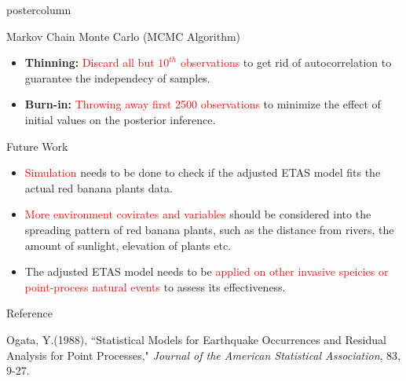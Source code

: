 \documentclass[final]{beamer}\usepackage[]{graphicx}\usepackage[]{color}
\newcommand{\red}{\textcolor{red}}
\begin{document}
{\begin{frame}
\begin{columns}
\begin{column}{.33\textwidth}
\begin{beamercolorbox}[center,wd=\textwidth]{postercolumn}
\begin{minipage}[T]{.97\textwidth}
{\begin{block}{Markov Chain Monte Carlo (MCMC Algorithm)}
\begin{itemize}
		  
		\vspace{0.4cm}
		
		
		
		\item \textbf{Thinning:} \red{Discard all but $10^{th}$ observations} to get rid of autocorrelation to guarantee the independecy of samples.
		\vspace{0.4cm}
		\item \textbf{Burn-in:} \red{Throwing away first 2500 observations} to minimize the effect of initial values on the posterior inference.
		
	\end{itemize}
	

\end{block}
\vfill

\begin{block}{Future Work}


\begin{itemize}
\item \red{Simulation} needs to be done to check if the adjusted ETAS model fits the actual red banana plants data.
\vspace{0.4cm}
\item \red{More environment covirates and variables} should be considered into the spreading pattern of red banana plants, such as the distance from rivers, the amount of sunlight, elevation of plants etc.
\vspace{0.4cm}
\item The adjusted ETAS model needs to be \red{applied on other invasive speicies or point-process natural events} to assess its effectiveness.
\end{itemize}



\end{block}
\vfill

\begin{block}{Reference}

\begin{thebibliography}{}

Ogata, Y.(1988),
``Statistical Models for Earthquake Occurrences and Residual Analysis for Point Processes,"
\textit{Journal of the American Statistical Association}, 83, 9-27.


\end{thebibliography}
\end{block}}
\end{minipage}
\end{beamercolorbox}
\end{column}
\end{columns}
\end{frame}}
\end{document}
